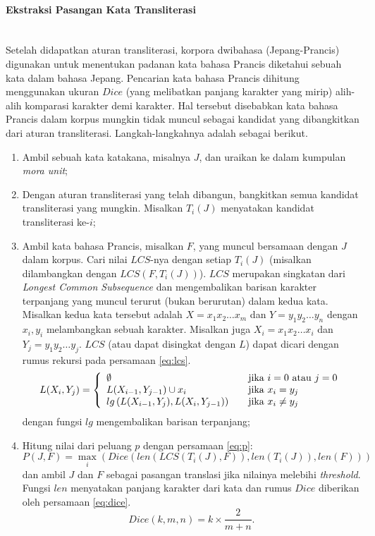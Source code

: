 \documentclass[../main/main.tex]{subfiles}
\begin{document}
\paragraph{Ekstraksi Pasangan Kata Transliterasi} ~\\
Setelah didapatkan aturan transliterasi, korpora dwibahasa (Jepang-Prancis) digunakan untuk menentukan padanan kata bahasa Prancis diketahui sebuah kata dalam bahasa Jepang. Pencarian kata bahasa Prancis dihitung menggunakan ukuran $Dice$ (yang melibatkan panjang karakter yang mirip) alih-alih komparasi karakter demi karakter. Hal tersebut disebabkan kata bahasa Prancis dalam korpus mungkin tidak muncul sebagai kandidat yang dibangkitkan dari aturan transliterasi. Langkah-langkahnya adalah sebagai berikut.
\begin{enumerate}
\item Ambil sebuah kata katakana, misalnya $J$, dan uraikan ke dalam kumpulan \textit{mora unit};
\item Dengan aturan transliterasi yang telah dibangun, bangkitkan semua kandidat transliterasi yang mungkin. Misalkan $T_i(J)$ menyatakan kandidat transliterasi ke-$i$;
\item Ambil kata bahasa Prancis, misalkan $F$, yang muncul bersamaan dengan $J$ dalam korpus. Cari nilai $LCS$-nya dengan setiap $T_i(J)$ (misalkan dilambangkan dengan $LCS(F,T_i(J))$). $LCS$ merupakan singkatan dari \textit{Longest Common Subsequence} dan mengembalikan barisan karakter terpanjang yang muncul terurut (bukan berurutan) dalam kedua kata. Misalkan kedua kata tersebut adalah $X = x_1x_2 \ldots x_m$ dan $Y = y_1y_2 \ldots y_n$ dengan $x_i,y_i$ melambangkan sebuah karakter. Misalkan juga $X_i = x_1x_2 \ldots x_i$ dan $Y_j = y_1y_2 \ldots y_j$. $LCS$ (atau dapat disingkat dengan $L$) dapat dicari dengan rumus rekursi pada persamaan \ref{eq:lcs}.
\begin{equation} \label{eq:lcs}
	L(X_i,Y_j) = \left\{
		\begin{array}{l l}
			\emptyset &\quad \text{jika $i = 0$ atau $j = 0$}\\
			L(X_{i-1},Y_{j-1}) \cup x_i &\quad \text{jika $x_i = y_j$}\\
			lg \left( L(X_{i-1},Y_j), L(X_i,Y_{j-1}) \right) &\quad \text{jika $x_i \neq y_j$}
		\end{array}
	\right.
\end{equation}
dengan fungsi $lg$ mengembalikan barisan terpanjang;
\item Hitung nilai dari peluang $p$ dengan persamaan \ref{eq:p}:
\begin{equation} \label{eq:p}
	P(J,F) = \max_i \left( Dice \left( len \left( LCS(T_i(J), F) \right), len \left( T_i(J) \right), len \left( F \right) \right) \right)
\end{equation}
dan ambil $J$ dan $F$ sebagai pasangan translasi jika nilainya melebihi \textit{threshold}. Fungsi $len$ menyatakan panjang karakter dari kata dan rumus $Dice$ diberikan oleh persamaan \ref{eq:dice}.
\begin{equation} \label{eq:dice}
	Dice(k,m,n) = k \times \frac{2}{m + n}.
\end{equation}
\end{enumerate}
\end{document}
